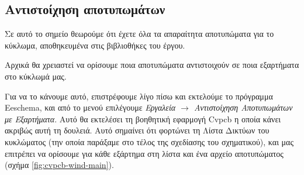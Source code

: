 \documentclass[a4paper]{article}
\begin{document}

\subsection{Αντιστοίχηση αποτυπωμάτων}
Σε αυτό το σημείο θεωρούμε ότι έχετε όλα τα απαραίτητα αποτυπώματα για το κύκλωμα, αποθηκευμένα στις βιβλιοθήκες του έργου.

Αρχικά θα χρειαστεί να ορίσουμε ποια αποτυπώματα αντιστοιχούν σε ποια εξαρτήματα στο κύκλωμά μας. 

Για να το κάνουμε αυτό, επιστρέφουμε λίγο πίσω και εκτελούμε το πρόγραμμα Eeschema, και από το μενού επιλέγουμε \textit{Εργαλεία $\rightarrow$ Αντιστοίχηση Αποτυπωμάτων με Εξαρτήματα}. Αυτό θα εκτελέσει τη βοηθητική εφαρμογή \textenglish{Cvpcb} η οποία κάνει ακριβώς αυτή τη δουλειά. Αυτό σημαίνει ότι φορτώνει τη Λίστα Δικτύων του κυκλώματος (την οποία παράξαμε στο τέλος της σχεδίασης του σχηματικού), και μας επιτρέπει να ορίσουμε για κάθε εξάρτημα στη λίστα και ένα αρχείο αποτυπώματος (σχήμα \ref{fig:cvpcb-wind-main}).
\end{document}
